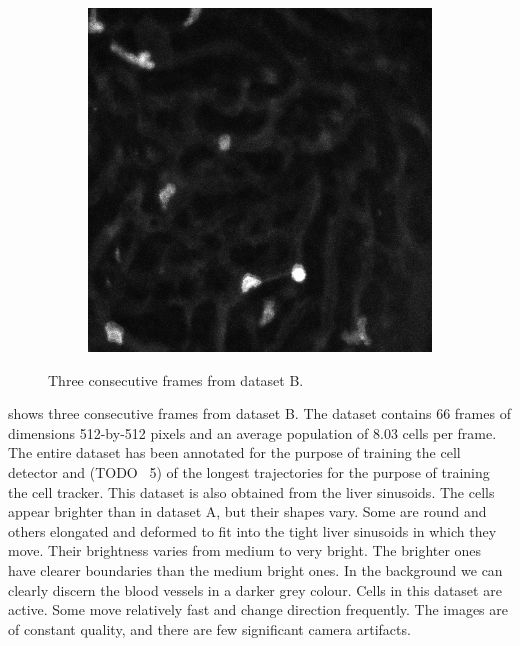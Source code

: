 \begin{figure}[h]
\begin{subfigure}{.32\textwidth}
		\end{subfigure}
		\hfill
		\begin{subfigure}{.32\textwidth}
		\includegraphics[width=\textwidth]{images/series30red025}
		\end{subfigure}
		\caption{Three consecutive frames from dataset B.}
		\label{fig:data_datasetB}
	\end{figure}
		
	 shows three consecutive frames from dataset B. The dataset contains 66 frames of dimensions 512-by-512 pixels and an average population of 8.03 cells per frame. The entire dataset has been annotated for the purpose of training the cell detector and (TODO ~5) of the longest trajectories for the purpose of training the cell tracker. This dataset is also obtained from the liver sinusoids. The cells appear brighter than in dataset A, but their shapes vary. Some are round and others elongated and deformed to fit into the tight liver sinusoids in which they move. Their brightness varies from medium to very bright. The brighter ones have clearer boundaries than the medium bright ones. In the background we can clearly discern the blood vessels in a darker grey colour. Cells in this dataset are active. Some move relatively fast and change direction frequently. The images are of constant quality, and there are few significant camera artifacts.

